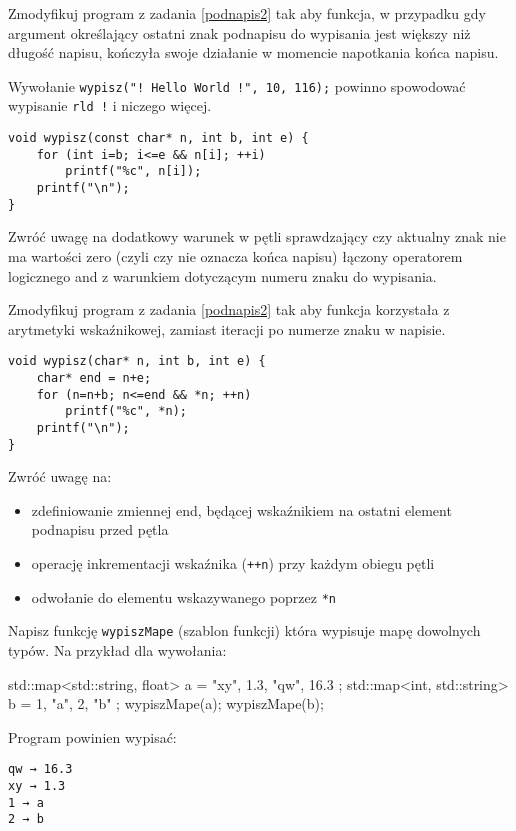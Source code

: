 \dbEntryCheckResults
Zmodyfikuj program z zadania \ref{podnapis2} tak aby funkcja, w przypadku gdy argument określający ostatni znak podnapisu do wypisania jest większy niż długość napisu, kończyła swoje działanie w momencie napotkania końca napisu.

Wywołanie \Verb#wypisz("! Hello World !", 10, 116);# powinno spowodować wypisanie \Verb#rld !# i niczego więcej.
\fi

\dbEntryCheckResults
\begin{verbatim}
void wypisz(const char* n, int b, int e) {
	for (int i=b; i<=e && n[i]; ++i)
		printf("%c", n[i]);
	printf("\n");
}
\end{verbatim}

\noindent Zwróć uwagę na dodatkowy warunek w pętli sprawdzający czy aktualny znak nie ma wartości zero (czyli czy nie oznacza końca napisu) łączony operatorem logicznego and z warunkiem dotyczącym numeru znaku do wypisania.
\fi


\dbEntryCheckResults
Zmodyfikuj program z zadania \ref{podnapis2} tak aby funkcja korzystała z arytmetyki wskaźnikowej, zamiast iteracji po numerze znaku w napisie.
\fi

\dbEntryCheckResults
\begin{verbatim}
void wypisz(char* n, int b, int e) {
	char* end = n+e;
	for (n=n+b; n<=end && *n; ++n)
		printf("%c", *n);
	printf("\n");
}
\end{verbatim}

\noindent Zwróć uwagę na:
\begin{itemize}
\item zdefiniowanie zmiennej end, będącej wskaźnikiem na ostatni element podnapisu przed pętla
\item operację inkrementacji wskaźnika (\Verb$++n$) przy każdym obiegu pętli
\item odwołanie do elementu wskazywanego poprzez \Verb$*n$
\end{itemize}
\fi


\dbEntryCheckResults
Napisz funkcję \Verb#wypiszMape# (szablon funkcji) która wypisuje mapę dowolnych typów. Na przykład dla wywołania:
\begin{CodeFrame*}[cpp]{}
std::map<std::string, float> a = { {"xy", 1.3}, {"qw", 16.3} };
std::map<int, std::string> b = { {1, "a"}, {2, "b"} };
wypiszMape(a);
wypiszMape(b);
\end{CodeFrame*}
\vspace{-8pt}Program powinien wypisać:
\vspace{-8pt}\begin{Verbatim}
qw → 16.3
xy → 1.3
1 → a
2 → b
\end{Verbatim}
\fi

